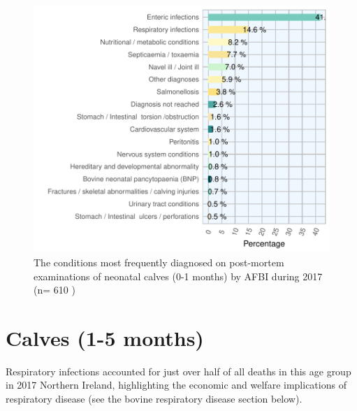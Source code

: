 \documentclass[]{book}
\begin{document}
\begin{figure}

{\centering \includegraphics{AFBI_files/figure-latex/unnamed-chunk-7-1} 

}

\caption{The conditions most frequently diagnosed on post-mortem examinations of neonatal calves (0-1 months) by AFBI during 2017 (n= 610 )}\label{fig:unnamed-chunk-7}
\end{figure}

\section{Calves (1-5 months)}\label{calves-1-5-months}

Respiratory infections accounted for just over half of all deaths in
this age group in 2017 Northern Ireland, highlighting the economic and
welfare implications of respiratory disease (see the bovine respiratory
disease section below).
\end{document}
